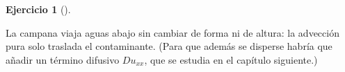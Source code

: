 \documentclass[
  spanish,
  a4paper,
]{scrreport}
\newenvironment{Shaded}{\begin{snugshade}}{\end{snugshade}}
\newcommand{\ConstantTok}[1]{\textcolor[rgb]{0.56,0.35,0.01}{#1}}
\newcommand{\ControlFlowTok}[1]{\textcolor[rgb]{0.00,0.23,0.31}{\textbf{#1}}}
\newcommand{\FloatTok}[1]{\textcolor[rgb]{0.68,0.00,0.00}{#1}}
\newcommand{\FunctionTok}[1]{\textcolor[rgb]{0.28,0.35,0.67}{#1}}
\newcommand{\KeywordTok}[1]{\textcolor[rgb]{0.00,0.23,0.31}{\textbf{#1}}}
\newcommand{\NormalTok}[1]{\textcolor[rgb]{0.00,0.23,0.31}{#1}}
\newcommand{\OperatorTok}[1]{\textcolor[rgb]{0.37,0.37,0.37}{#1}}
\newcommand{\PreprocessorTok}[1]{\textcolor[rgb]{0.68,0.00,0.00}{#1}}
\newcommand{\SpecialCharTok}[1]{\textcolor[rgb]{0.37,0.37,0.37}{#1}}
\newcommand{\StringTok}[1]{\textcolor[rgb]{0.13,0.47,0.30}{#1}}
\theoremstyle{definition}
\newtheorem{exercise}{Ejercicio}[chapter]
\theoremstyle{remark}
\begin{document}
\begin{exercise}[]
\begin{enumerate}
\begin{tcolorbox}
\begin{Shaded}
\end{Shaded}

  La campana viaja aguas abajo sin cambiar de forma ni de altura: la
  advección pura solo traslada el contaminante. (Para que además se
  disperse habría que añadir un término difusivo \(D u_{xx}\), que se
  estudia en el capítulo siguiente.)

  \end{tcolorbox}
\end{enumerate}

\end{exercise}
\end{document}
